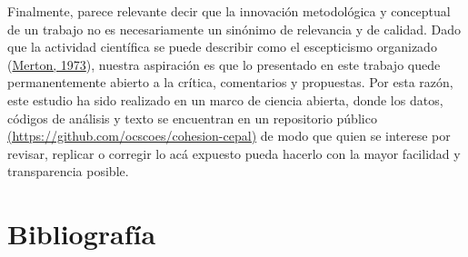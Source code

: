 \documentclass[
  12pt,
]{book}
\begin{document}
Finalmente, parece relevante decir que la innovación metodológica y conceptual de un trabajo no es necesariamente un sinónimo de relevancia y de calidad. Dado que la actividad científica se puede describir como el escepticismo organizado (\protect\hyperlink{ref-merton_sociology_1973}{Merton, 1973}), nuestra aspiración es que lo presentado en este trabajo quede permanentemente abierto a la crítica, comentarios y propuestas. Por esta razón, este estudio ha sido realizado en un marco de ciencia abierta, donde los datos, códigos de análisis y texto se encuentran en un repositorio público \href{https://github.com/ocscoes/cohesion-cepal}{(https://github.com/ocscoes/cohesion-cepal)} de modo que quien se interese por revisar, replicar o corregir lo acá expuesto pueda hacerlo con la mayor facilidad y transparencia posible.

\hypertarget{bibliografuxeda}{%
\chapter*{Bibliografía}\label{bibliografuxeda}}
\end{document}
